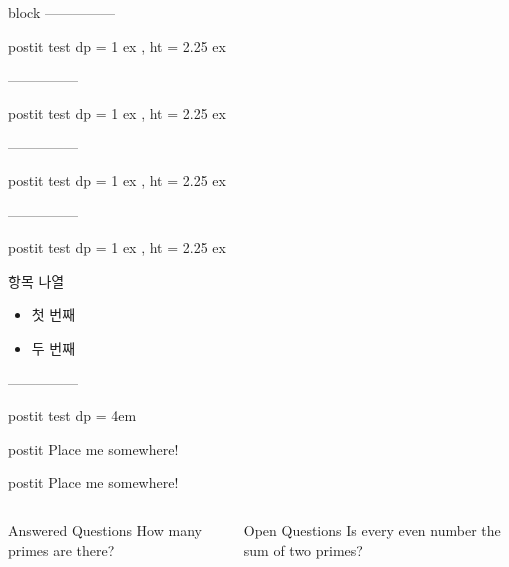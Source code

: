 \documentclass[9pt,blue,xcolor=pdftex,dvipsnames,table,handout,notes]{beamer}
\begin{document}
\begin{frame}{block}
---------------
\begin{beamercolorbox}[dp=1ex, ht=2.25ex, left, leftskip=8ex]{postit}
	test dp = 1 ex , ht = 2.25 ex
\end{beamercolorbox}

---------------
\begin{beamercolorbox}[dp=1ex, ht=2.25ex, left, leftskip=8ex]{postit}
	test dp = 1 ex , ht = 2.25 ex
\end{beamercolorbox}
 
---------------
\begin{beamercolorbox}[dp=1ex, ht=2.25ex, right]{postit}
test dp = 1 ex , ht = 2.25 ex
\end{beamercolorbox}

---------------
\begin{beamercolorbox}[dp=1ex, ht=2.25ex, right, rightskip=4ex]{postit}
	test dp = 1 ex , ht = 2.25 ex
\end{beamercolorbox}

			\begin{block} {항목 나열}
			\begin{itemize}
			\item 첫 번째
			\item 두 번째
			\end{itemize}
			\end{block}

---------------

	\begin{beamercolorbox}[ht=4em,center]{postit}
	test dp = 4em
	\end{beamercolorbox}
	
	\begin{beamercolorbox}[sep=4em,wd=10cm]{postit}
	Place me somewhere!
	\end{beamercolorbox}

	\begin{beamercolorbox}[sep=1em,wd=1.0\textwidth]{postit}
	Place me somewhere!
	\end{beamercolorbox}

	\begin{columns}[T]
		\begin{block}{Answered Questions}
		How many primes are there?
		\end{block}
		\begin{block}{Open Questions}
		Is every even number the sum of two primes?
		\end{block}
	\end{columns}


\end{frame}
\end{document}
